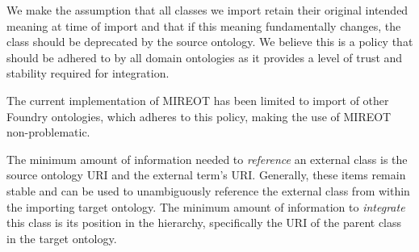 \documentclass[a4paper,10pt,twocolumn]{article}
\begin{document}




We make the assumption that all classes we import retain their original intended meaning at time of import and that if this meaning fundamentally changes, the class should be deprecated by the source ontology. 
We believe this is a policy that should be adhered to by all domain ontologies as it provides a level of trust and stability required for integration. 


The current implementation of \ac{MIREOT} has been limited to import of other Foundry ontologies, which adheres to this policy, making the use of \ac{MIREOT} non-problematic.




The minimum amount of information needed to \textit{reference} an external class is the source ontology URI and the external term's URI. 
Generally, these items remain stable and can be used to unambiguously reference the external class from within the importing target ontology.
The minimum amount of information to \textit{integrate} this class is its position in the hierarchy, specifically the URI of the parent class in the target ontology.
\end{document}

